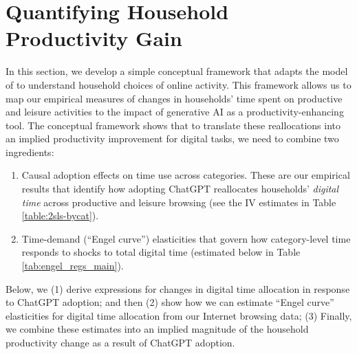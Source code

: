 \documentclass[12pt]{article}
\begin{document}
\section{Quantifying Household Productivity Gain} \label{sec:conceptual-framework}
In this section, we develop a simple conceptual framework that adapts the model of \cite{aguiar2021} to understand household choices of online activity. This framework allows us to map our empirical measures of changes in households' time spent on productive and leisure activities to the impact of generative AI as a productivity-enhancing tool.  The conceptual framework shows that to translate these reallocations into an implied productivity improvement for digital tasks, we need to combine
 two ingredients:
\begin{enumerate}
    \item {Causal adoption effects on time use across categories.} These are our empirical results that identify how adopting ChatGPT reallocates households' \emph{digital time} across productive and leisure browsing (see the IV estimates in Table \ref{table:2sls-bycat}).
    \item {Time-demand (``Engel curve'') elasticities} that govern how category-level time
    responds to shocks to total digital time (estimated below in Table \ref{tab:engel_regs_main}).
\end{enumerate}

Below, we (1) derive expressions for changes in digital time allocation in response to ChatGPT adoption; and then (2) show how we can estimate ``Engel curve'' elasticities for digital time allocation from our Internet browsing data; (3) Finally, we  combine these estimates into an implied magnitude of the household productivity change as a result of ChatGPT adoption.
\end{document}
